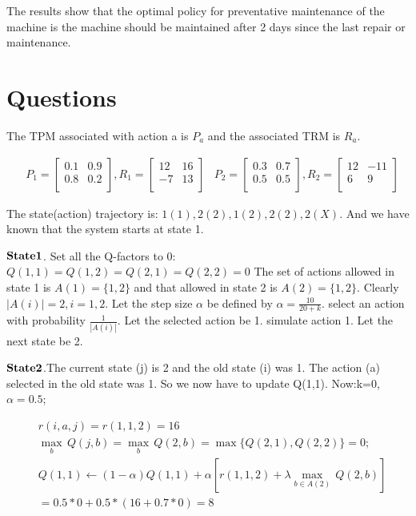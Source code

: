 \documentclass[12pt]{article}%
\begin{document}
The results show that the optimal policy for preventative maintenance of the machine is the machine should be maintained after 2 days since the last repair or maintenance.

\section{Questions}

The TPM associated with action a is $P_a$ and the associated TRM is $R_a$.

\begin{align}
  & {{P}_{1}}=\left[ \begin{matrix}
   0.1 & 0.9  \\
   0.8 & 0.2  \\
\end{matrix} \right],{{R}_{1}}=\left[ \begin{matrix}
   12 & 16  \\
   -7 & 13  \\
\end{matrix} \right]
 & {{P}_{2}}=\left[ \begin{matrix}
   0.3 & 0.7  \\
   0.5 & 0.5  \\
\end{matrix} \right],{{R}_{2}}=\left[ \begin{matrix}
   12 & -11  \\
   6 & 9  \\
\end{matrix} \right] 
\end{align}

The state(action) trajectory is: 
$1(1),2(2),1(2),2(2),2(X)$. And we have known that the system starts at state 1.

$\bf{State 1}$. Set all the Q-factors to 0:
$Q(1,1)=Q(1,2)=Q(2,1)=Q(2,2)=0$
The set of actions allowed in state 1 is $A(1)=\{1,2\}$ and that allowed in state 2 is $A(2)=\{1,2\}$. Clearly $|A(i)|=2,i=1,2$. Let the step size $\alpha $ be defined by $\alpha =\frac{10}{20+k}$. select an action with probability $\frac{1}{|A(i)|}$. Let the selected action be 1. simulate action 1. Let the next state be 2.

$\bf{State 2}$.The current state (j) is 2 and the old state (i) was 1. The action (a) selected in the old state was 1. So we now have to update Q(1,1). Now:k=0, $\alpha=0.5$;

\begin{align}
  & r(i,a,j)=r(1,1,2)=16 \\ 
 & \underset{b}{\mathop{\max }}\,Q(j,b)=\underset{b}{\mathop{\max }}\,Q(2,b)=\max \{Q(2,1),Q(2,2)\}=0; \\
  & Q(1,1)\leftarrow (1-\alpha )Q(1,1)+\alpha [r(1,1,2)+\lambda \underset{b\in A(2)}{\mathop{\max }}\,Q(2,b)] \\ 
 & =0.5*0+0.5*(16+0.7*0)=8 
\end{align}
\end{document}
